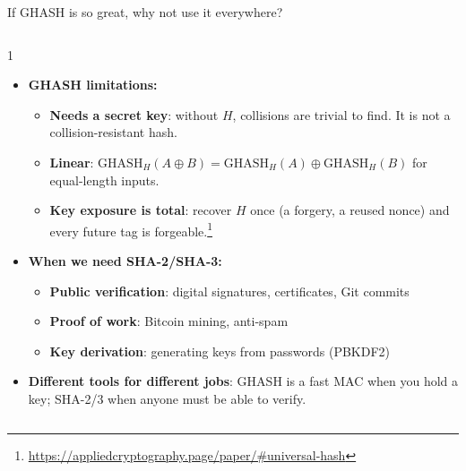 \ifdefined\PRESENTATION\else\PassOptionsToClass{handout}{beamer}\fi\documentclass[aspectratio=169, lualatex]{beamer}
\begin{document}
\begin{frame}{If GHASH is so great, why not use it everywhere?}
	\begin{columns}[c]
		\begin{column}{1\textwidth}
			\begin{itemize}
				\item \textbf{GHASH limitations:}
				      \begin{itemize}
					      \item \textbf{Needs a secret key}: without $H$, collisions are trivial to find. It is not a collision-resistant hash.
					      \item \textbf{Linear}: $\text{GHASH}_H(A \oplus B) = \text{GHASH}_H(A) \oplus \text{GHASH}_H(B)$ for equal-length inputs.
					      \item \textbf{Key exposure is total}: recover $H$ once (a forgery, a reused nonce) and every future tag is forgeable.\footnote{\url{https://appliedcryptography.page/paper/\#universal-hash}}
				      \end{itemize}
				\item \textbf{When we need SHA-2/SHA-3:}
				      \begin{itemize}
					      \item \textbf{Public verification}: digital signatures, certificates, Git commits
					      \item \textbf{Proof of work}: Bitcoin mining, anti-spam
					      \item \textbf{Key derivation}: generating keys from passwords (PBKDF2)
				      \end{itemize}
				\item \textbf{Different tools for different jobs}: GHASH is a fast MAC when you hold a key; SHA-2/3 when anyone must be able to verify.
			\end{itemize}
		\end{column}
	\end{columns}
\end{frame}
\end{document}
